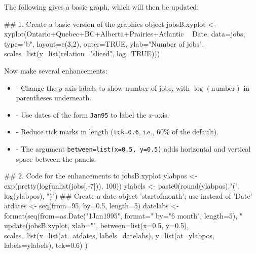\documentclass{tufte-book}\usepackage[]{graphicx}\usepackage[]{color}
\newcommand{\txtt}[1]{\texttt{#1}}
\newenvironment{itemizz}%
  {\begin{itemize} %
    \setlength{\itemsep}{2pt}%
    \setlength{\parskip}{2pt}} %
  {\end{itemize}}
\begin{document}
The following gives a basic graph, which will then be updated:
\noindent
\begin{fullwidth}

\begin{Schunk}
\begin{Sinput}
## 1. Create a basic version of the graphics object
jobsB.xyplot <-
  xyplot(Ontario+Quebec+BC+Alberta+Prairies+Atlantic ~ Date,
         data=jobs, type="b", layout=c(3,2), outer=TRUE,
         ylab="Number of jobs",
         scales=list(y=list(relation="sliced", log=TRUE)))
\end{Sinput}
\end{Schunk}

\end{fullwidth}

\noindent
Now make several enhancements:
\begin{itemizz}
\item[-] Change the $y$-axis labels to show number of jobs, with
$\log(\mbox{number})$ in parentheses underneath.
\item[-] Use dates of the form \txtt{Jan95} to label the
  $x$-axis.
\item[-] Reduce tick marks in length (\txtt{tck=0.6}, i.e.,
60\% of the default).
\item[-] The argument \txtt{between=list(x=0.5, y=0.5)} adds
  horizontal and vertical space between the panels.
\end{itemizz}

\begin{fullwidth}

\begin{Schunk}
\begin{Sinput}
## 2. Code for the enhancements to jobsB.xyplot
ylabpos <- exp(pretty(log(unlist(jobs[,-7])), 100))
ylabels <- paste0(round(ylabpos),"\n(", log(ylabpos), ")")
## Create a date object 'startofmonth'; use instead of 'Date'
atdates <- seq(from=95, by=0.5, length=5)
datelabs <- format(seq(from=as.Date("1Jan1995", format="%
                       by="6 month", length=5), "%
update(jobsB.xyplot, xlab="", between=list(x=0.5, y=0.5),
       scales=list(x=list(at=atdates, labels=datelabs),
                   y=list(at=ylabpos, labels=ylabels), tck=0.6) )
\end{Sinput}
\end{Schunk}

\end{fullwidth}
\end{document}
